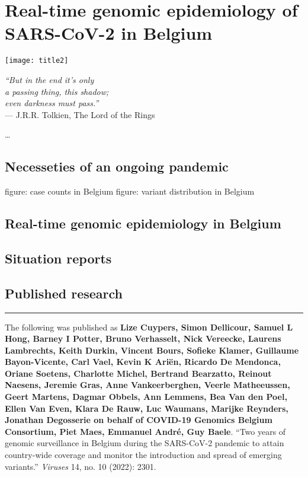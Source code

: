 \chapter{Real-time genomic epidemiology of SARS-CoV-2 in Belgium}\label{ch:chapter1}

\begin{minipage}[b]{0.6\textwidth}
    \texttt{[image: title2]} %
  \end{minipage}
  \hfill
  \begin{minipage}[b]{0.35\textwidth}
    \footnotesize
    \begin{flushright}
      \textit{``But in the end it's only\\a passing thing, this shadow;\\even darkness must pass.''} \\
      --- J.R.R.
Tolkien, The Lord of the Rings
    \end{flushright}
    \vspace{2cm}
  \end{minipage}
  
  \clearpage
\ldots

\section{Necesseties of an ongoing pandemic}
figure: case counts in Belgium
figure: variant distribution in Belgium

\section{Real-time genomic epidemiology in Belgium}

\section{Situation reports}

\section{Published research}

\hrule
\vspace*{12pt}
The following was published as \textbf{Lize Cuypers, Simon Dellicour, Samuel L Hong, Barney I Potter, Bruno Verhasselt, Nick Vereecke, Laurens Lambrechts, Keith Durkin, Vincent Bours, Sofieke Klamer, Guillaume Bayon-Vicente, Carl Vael, Kevin K Ari\"{e}n, Ricardo De Mendonca, Oriane Soetens, Charlotte Michel, Bertrand Bearzatto, Reinout Naesens, Jeremie Gras, Anne Vankeerberghen, Veerle Matheeussen, Geert Martens, Dagmar Obbels, Ann Lemmens, Bea Van den Poel, Ellen Van Even, Klara De Rauw, Luc Waumans, Marijke Reynders, Jonathan Degosserie on behalf of COVID-19 Genomics Belgium Consortium, Piet Maes, Emmanuel Andr\'{e}, Guy Baele}.
``Two years of genomic surveillance in Belgium during the SARS-CoV-2 pandemic to attain country-wide coverage and monitor the introduction and spread of emerging variants.'' \textit{Viruses} 14, no.
10 (2022): 2301.

